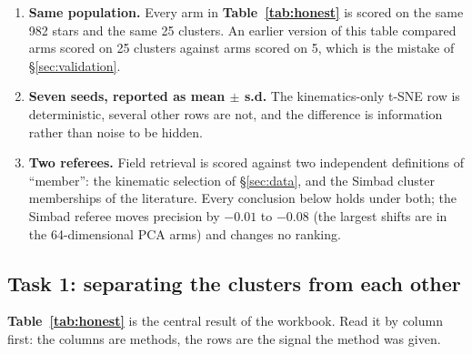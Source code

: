 \begin{enumerate}
\item \textbf{Same population.} Every arm in \textbf{Table~\ref{tab:honest}}
  is scored on the same 982 stars and the same 25 clusters. An earlier version
  of this table compared arms scored on 25 clusters against arms scored on 5,
  which is the mistake of \S\ref{sec:validation}.
\item \textbf{Seven seeds, reported as mean $\pm$ s.d.} The kinematics-only
  t-SNE row is deterministic, several other rows are not, and the difference
  is information rather than noise to be hidden.
\item \textbf{Two referees.} Field retrieval is scored against two independent
  definitions of ``member'': the kinematic selection of
  \S\ref{sec:data}, and the Simbad cluster memberships of the literature.
  Every conclusion below holds under both; the Simbad referee moves precision
  by $-0.01$ to $-0.08$ (the largest shifts are in the 64-dimensional PCA arms)
  and changes no ranking.
\end{enumerate}

\subsection{Task 1: separating the clusters from each other}

\textbf{Table~\ref{tab:honest}} is the central result of the workbook. Read it
by column first: the columns are methods, the rows are the signal the method
was given.


